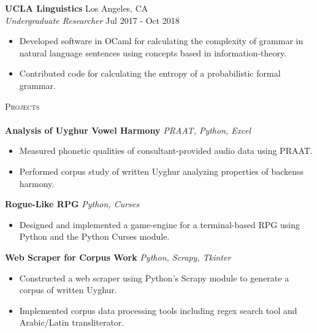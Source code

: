 \documentclass[]{article}
\newcommand{\lineunder} {
    \vspace*{-8pt} \\
    \hspace*{-18pt} \hrulefill \\
}
\newcommand{\header} [1] {
    {\hspace*{-18pt}\vspace*{6pt} \textsc{#1}}
    \vspace*{-6pt} \lineunder
}
\begin{document}
\textbf{UCLA Linguistics} \hfill Los Angeles, CA\\
\textit{Undergraduate Researcher} \hfill Jul 2017 - Oct 2018\\
\vspace{-3mm}
\begin{itemize} \itemsep 0pt
	\item Developed software in OCaml for calculating the complexity of grammar in natural language sentences using concepts based in information-theory.
	\item Contributed code for calculating the entropy of a probabilistic formal grammar.
\end{itemize}

\header{Projects}
{\textbf{Analysis of Uyghur Vowel Harmony}} \hspace*{5mm} {\sl PRAAT, Python, Excel}
\vspace*{-5pt}\begin{itemize}	\itemsep 0pt 
	\item Measured phonetic qualities of consultant-provided audio data using PRAAT.
	\item Performed corpus study of written Uyghur analyzing properties of backenss harmony.
\end{itemize}
\vspace*{0mm}

{\textbf{Rogue-Like RPG}} \hspace*{5mm} {\sl Python, Curses} \\
\vspace*{-5pt}\begin{itemize}	\itemsep 0pt
	\item Designed and implemented a game-engine for a terminal-based RPG using Python and the Python Curses module.
\end{itemize}
\vspace*{0mm}

{\textbf{Web Scraper for Corpus Work}} \hspace*{5mm} {\sl Python, Scrapy, Tkinter}
\vspace*{-5pt}\begin{itemize}	\itemsep 0pt 
	\item Constructed a web scraper using Python's Scrapy module to generate a corpus of written Uyghur.
	\item Implemented corpus data processing tools including regex search tool and Arabic/Latin transliterator.
\end{itemize}
\vspace*{0mm}
\end{document}
